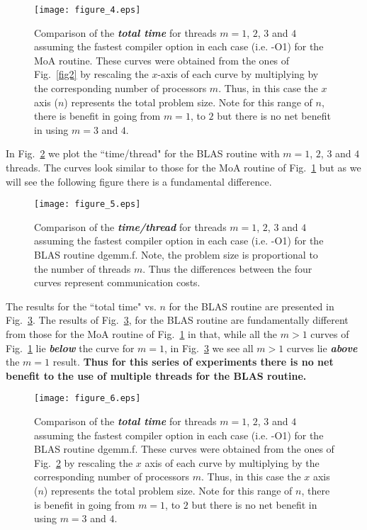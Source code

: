 \documentclass[aps,prl,twocolumn,groupedaddress,floatfix]{revtex4}
\begin{document}
\begin{figure} 
\texttt{[image: figure\_4.eps]}\caption{
\label{fig3} 
Comparison of the {\bf \em total time} for threads 
$m = 1$, $2$, $3$ and $4$ assuming the fastest compiler option in each 
case (i.e. -O1) for the MoA routine.   These curves were obtained from the 
ones of Fig.~\ref{fig2} by rescaling the $x$-axis of each curve by 
multiplying by the corresponding number of processors $m$.  Thus, in this 
case the $x$ axis ($n$) represents the total problem size.  Note for this 
range of $n$, there is benefit in going from $m = 1$, to $2$ but there is no 
net benefit in using $m = 3$ and $4$.
}
\end{figure}

In Fig.~\ref{fig4} we plot the ``time/thread" for the BLAS routine with
$m = 1$, $2$, $3$ and $4$ threads.  The curves look similar to those for
the MoA routine of Fig.~\ref{fig3} but as we will see the following figure
there is a fundamental difference.

\begin{figure} 
\texttt{[image: figure\_5.eps]}\caption{
\label{fig4}
Comparison of the {\bf \em time/thread} for threads $m = 1$, $2$,
$3$ and $4$ assuming the fastest compiler option in each case (i.e. -O1)
for the BLAS routine dgemm.f.  Note, the problem size is proportional to the 
number of threads $m$.  Thus the differences between the four curves represent 
communication costs.
}
\end{figure}

The results for the ``total time" vs. $n$ for the BLAS routine are presented
in Fig.~\ref{fig5}.  The results of Fig.~\ref{fig5}, for the BLAS routine
are fundamentally different from those for the MoA routine of Fig.~\ref{fig3}
in that, while all the $m > 1$ curves of Fig.~\ref{fig3} lie {\bf \em below}
the curve for $m = 1$, in Fig.~\ref{fig5} we see all $m > 1$ curves
lie {\bf \em above} the $m = 1$ result. {\bf Thus for this series of experiments
there is no net benefit to the use of multiple threads for the BLAS routine.}

\begin{figure} 
\texttt{[image: figure\_6.eps]}\caption{
\label{fig5}
Comparison of the {\bf \em total time} for threads
$m = 1$, $2$, $3$ and $4$ assuming the fastest compiler option in each
case (i.e. -O1) for the BLAS routine dgemm.f.   These curves were obtained 
from the ones of Fig.~\ref{fig4} by rescaling the $x$ axis of each curve 
by multiplying by the corresponding number of processors $m$.  Thus, in this 
case the $x$ axis ($n$) represents the total problem size.  Note for this 
range of $n$, there is benefit in going from $m = 1$, to $2$ but there is no
net benefit in using $m = 3$ and $4$.
}
\end{figure}
\end{document}
